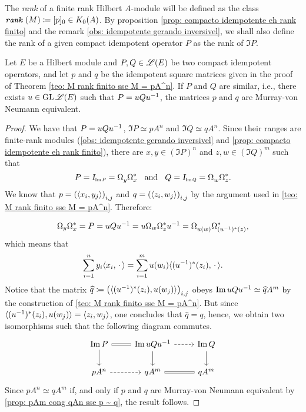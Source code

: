 \begin{definicao}
The \textit{rank} of a finite rank Hilbert $A$-module will be defined as the class $\texttt{\textit{rank}}\,(M) \coloneqq [p]_0 \in K_0(A)$. By proposition \ref{prop: compacto idempotente eh rank finito} and the remark \ref{obs: idempotente gerando inversivel}, we shall also define the rank of a given compact idempotent operator $P$ as the rank of $\Im P$.
\end{definicao}


\begin{lema}\label{lema: [P]_0 = [Q]_0 ---> [p]_0 = [q]_0}
    Let $E$ be a Hilbert module and $P, Q \in \mathscr L(E)$ be two compact idempotent operators, and let $p$ and $q$ be the idempotent square matrices given in the proof of Theorem \ref{teo: M rank finito sse M = pA^n}. If $P$ and $Q$ are similar, i.e., there exists $u \in \operatorname{GL} \mathscr L(E)$ such that $P = uQ{u}^{-1}$, the matrices $p$ and $q$ are Murray-von Neumann equivalent. 
    \begin{proof}
        We have that $P = uQ{u}^{-1}$, $\Im P \simeq pA^n$ and $\Im Q \simeq qA^n$. Since their ranges are finite-rank modules (\ref{obs: idempotente gerando inversivel} and \ref{prop: compacto idempotente eh rank finito}), there are $x,y \in (\Im P)^n$ and $z,w \in (\Im Q)^m$ such that 
        $$P = \sub\Id{\Im P} = \Omega_{y}^{\,}\Omega_x^* \e Q = \sub\Id{\Im Q} = \Omega_{w}^{\,}\Omega_z^*.$$ 
        We know that $p=\left(\langle {x_i},{y_j}\rangle\right)_{i,j}$ and $q=\left(\langle {z_i},{w_j}\rangle\right)_{i,j}$ by the argument used in \ref{teo: M rank finito sse M = pA^n}. Therefore:

        $$
        \Omega_y\Omega_x^* = P = uQ{u}^{-1} = u\Omega_{w}\Omega_z^*{u}^{-1} = \Omega_{u(w)}^{\,}\Omega_{({{u}^{-1}})^*(z)}^*, $$
        which means that
        $$\sum_{i=1}^n y_i \langle {x_i},{\operatorname{\,\cdot\,}}\rangle = \sum_{i=1}^m u(w_i)\langle {({u}^{-1})^*(z_i)},{\operatorname{\,\cdot\,}}\rangle.$$ 
        Notice that the matrix $\widehat q \coloneqq \left(\langle {({u}^{-1})^*(z_i)},{u(w_j)}\rangle\right)_{i,j}$ obeys $\operatorname{Im} uQ{u}^{-1} \simeq \widehat{q}A^m$ by the construction of \ref{teo: M rank finito sse M = pA^n}. But since $\langle {({u}^{-1})^*(z_i)},{u(w_j)}\rangle = \langle {z_i},{w_j}\rangle$, one concludes that $\widehat{q} = q$, hence, we obtain two isomorphisms such that the following diagram commutes.
        \begin{equation*}
\begin{tikzcd}
    \Im P \arrow[d]        & \Im uQu^{-1} \arrow[l, no head, equal] \arrow[d] \arrow[r, dashed] & \Im Q \arrow[d] \\
    pA^n \arrow[r, dashed] & qA^m \arrow[r, no head, equal]                                     & qA^m           
    \end{tikzcd}
        \end{equation*}
        Since $pA^n\simeq qA^m$ if, and only if $p$ and $q$ are Murray-von Neumann equivalent by \ref{prop: pAm cong qAn sse p ~ q}, the result follows. 
    \end{proof}   
\end{lema}

